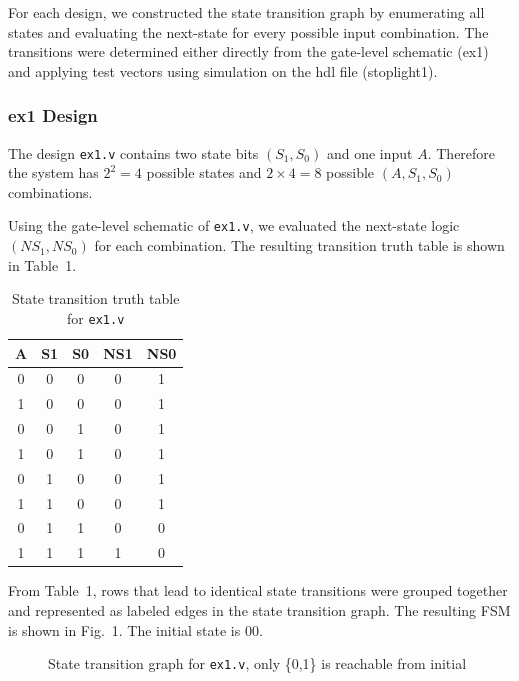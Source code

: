 \documentclass[10pt]{article}
\begin{document}
For each design, we constructed the state transition graph by enumerating all states and evaluating the next-state for every possible input combination. The transitions were determined either directly from the gate-level schematic (ex1) and applying test vectors using simulation on the hdl file (stoplight1).

\subsubsection*{ex1 Design}

The design \texttt{ex1.v} contains two state bits $(S_1,S_0)$ and one input $A$. Therefore the system has $2^2 = 4$ possible states and $2 \times 4 = 8$ possible $(A,S_1,S_0)$ combinations.

Using the gate-level schematic of \texttt{ex1.v}, we evaluated the next-state logic $(NS_1,NS_0)$ for each combination. The resulting transition truth table is shown in Table~1.

\begin{table}[h]
\centering
\begin{tabular}{c c c | c c}
\toprule
A & S1 & S0 & NS1 & NS0 \\
\midrule
0 & 0 & 0 & 0 & 1 \\
1 & 0 & 0 & 0 & 1 \\
0 & 0 & 1 & 0 & 1 \\
1 & 0 & 1 & 0 & 1 \\
0 & 1 & 0 & 0 & 1 \\
1 & 1 & 0 & 0 & 1 \\
0 & 1 & 1 & 0 & 0 \\
1 & 1 & 1 & 1 & 0 \\
\bottomrule
\end{tabular}
\caption{State transition truth table for \texttt{ex1.v}}
\end{table}

From Table~1, rows that lead to identical state transitions were grouped together and represented as labeled edges in the state transition graph. The resulting FSM is shown in Fig.~1. The initial state is $00$.

\begin{figure}[H]
\centering
{}
\caption{State transition graph for \texttt{ex1.v}, only \{0,1\} is reachable from initial}
\end{figure}
\end{document}
